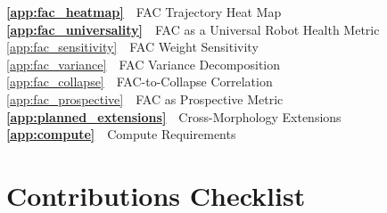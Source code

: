 \documentclass{article}
\begin{document}
{{\noindent\textbf{\ref{app:fac_heatmap}}~~FAC Trajectory Heat Map\dotfill\pageref{app:fac_heatmap}\\
\noindent\textbf{\ref{app:fac_universality}}~~FAC as a Universal Robot Health Metric\dotfill\pageref{app:fac_universality}\\
\hspace{2em}\ref{app:fac_sensitivity}~~FAC Weight Sensitivity\dotfill\pageref{app:fac_sensitivity}\\
\hspace{2em}\ref{app:fac_variance}~~FAC Variance Decomposition\dotfill\pageref{app:fac_variance}\\
\hspace{2em}\ref{app:fac_collapse}~~FAC-to-Collapse Correlation\dotfill\pageref{app:fac_collapse}\\
\hspace{2em}\ref{app:fac_prospective}~~FAC as Prospective Metric\dotfill\pageref{app:fac_prospective}\\
\noindent\textbf{\ref{app:planned_extensions}}~~Cross-Morphology Extensions\dotfill\pageref{app:planned_extensions}\\
\noindent\textbf{\ref{app:compute}}~~Compute Requirements\dotfill\pageref{app:compute}\\
}
\clearpage

\section{Contributions Checklist}
\label{app:contributions}

}
\end{document}
